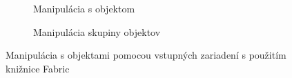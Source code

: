 \begin{figure}
	\centering
	\begin{subfigure}[b]{0.48\linewidth}	
		\caption{Manipulácia s objektom}
		\label{img:fabric-object-selection}
	\end{subfigure}
	\quad
	\begin{subfigure}[b]{0.48\linewidth}	
		\caption{Manipulácia skupiny objektov}
		\label{img:fabric-group-selection}
	\end{subfigure}
	\caption[Fabric - ukážka manipulácie s objektami]{Manipulácia s objektami pomocou vstupných zariadení s použitím knižnice Fabric}
\end{figure}
\FloatBarrier

